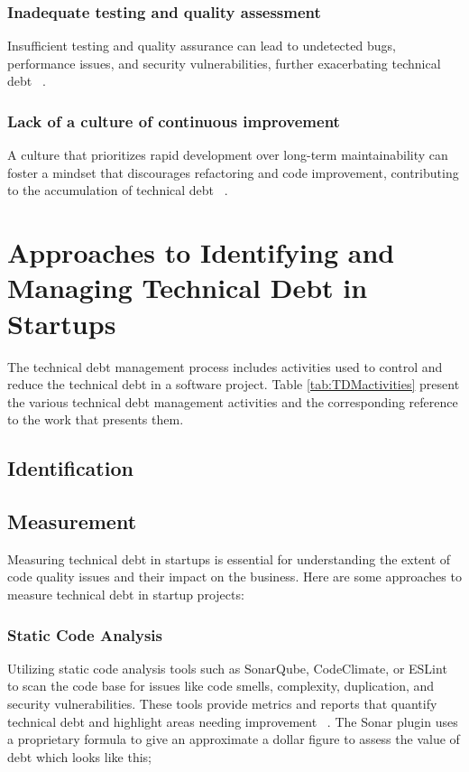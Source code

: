 \subsubsection{Inadequate testing and quality assessment}
Insufficient testing and quality assurance can lead to undetected bugs, performance issues, and security vulnerabilities, further exacerbating technical debt ~\cite{HowtoGet43:online}.

\subsubsection{Lack of a culture of continuous improvement}
A culture that prioritizes rapid development over long-term maintainability can foster a mindset that discourages refactoring and code improvement, contributing to the accumulation of technical debt ~\cite{FowlerBottlenecks,Whopayso60:online}.



\section{Approaches to Identifying and Managing Technical Debt in Startups}
The technical debt management process includes activities used to control and reduce the technical debt in a software project. Table \ref{tab:TDMactivities} present the various technical debt management activities and the corresponding reference to the work that presents them.

\subsection{Identification}

\subsection{Measurement}
Measuring technical debt in startups is essential for understanding the extent of code quality issues and their impact on the business. Here are some approaches to measure technical debt in startup projects:

\subsubsection{Static Code Analysis} 
Utilizing static code analysis tools such as SonarQube, CodeClimate, or ESLint to scan the code base for issues like code smells, complexity, duplication, and security vulnerabilities. These tools provide metrics and reports that quantify technical debt and highlight areas needing improvement ~\cite{Whopayso60:online}. The Sonar plugin uses a proprietary formula to give an approximate a dollar figure to assess the value of debt which looks like this;

